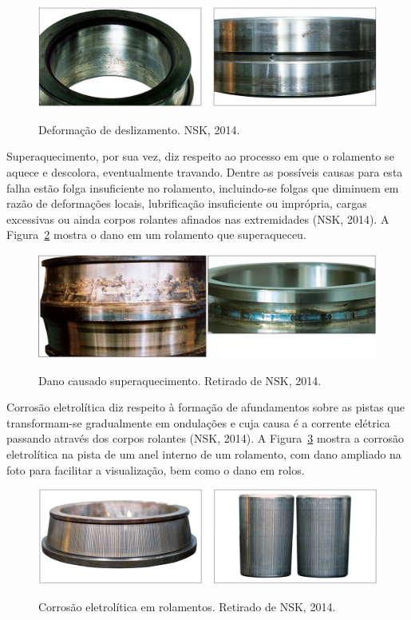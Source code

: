 \documentclass[
	12pt,				
	oneside,			
	a4paper,			
	english,			
	brazil,			
	]{abntex2ppgsi}
\begin{document}
\begin{figure}[H]
\centering
\caption {Deformação de deslizamento. NSK, 2014.}
\includegraphics[width=\textwidth,height=\textheight,keepaspectratio]{deslizamento_nsk}
\label{deslizamento_nsk}
\end{figure}

Superaquecimento, por sua vez, diz respeito ao processo em que o rolamento se aquece e descolora, eventualmente travando. Dentre as possíveis causas para esta falha estão folga insuficiente no rolamento, incluindo-se folgas que diminuem em razão de deformações locais, lubrificação insuficiente ou imprópria, cargas excessivas ou ainda corpos rolantes afinados nas extremidades (NSK, 2014). A Figura~\ref{superaquecimento_nsk} mostra o dano em um rolamento que superaqueceu.

\begin{figure}[H]
\centering
\caption {Dano causado superaquecimento. Retirado de NSK, 2014.}
\includegraphics[width=\textwidth,height=\textheight,keepaspectratio]{superaquecimento_nsk}
\label{superaquecimento_nsk}
\end{figure}

Corrosão eletrolítica diz respeito à formação de afundamentos sobre as pistas que transformam-se gradualmente em ondulações e cuja causa é a corrente elétrica passando através dos corpos rolantes (NSK, 2014). A Figura~\ref{corrosao_eletrolitica_nsk} mostra a corrosão eletrolítica na pista de um anel interno de um rolamento, com dano ampliado na foto para facilitar a visualização, bem como o dano em rolos. 

\begin{figure}[H]
\centering
\caption {Corrosão eletrolítica em rolamentos. Retirado de NSK, 2014.}
\includegraphics[width=\textwidth,height=\textheight,keepaspectratio]{corrosao_eletrolitica_nsk}
\label{corrosao_eletrolitica_nsk}
\end{figure}
\end{document}
